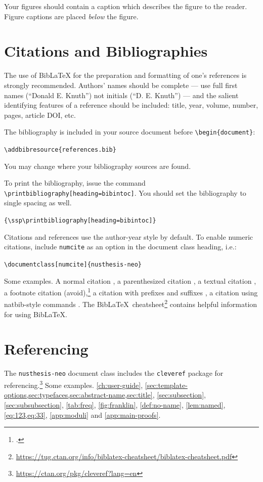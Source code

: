 Your figures should contain a caption which describes the figure to
the reader. Figure captions are placed \emph{below} the figure.


\section{Citations and Bibliographies}\label{sec:citations}

The use of BibLaTeX for the preparation and formatting of one's
references is strongly recommended. Authors' names should be complete
--- use full first names (``Donald E. Knuth'') not initials
(``D. E. Knuth'') --- and the salient identifying features of a
reference should be included: title, year, volume, number, pages,
article DOI, etc.

The bibliography is included in your source document before 
\texttt{\textbackslash begin\{document\}}:

\texttt{\textbackslash addbibresource\{references.bib\}}

You may change where your bibliography sources are found.

To print the bibliography, issue the command
\texttt{\textbackslash printbibliography[heading=bibintoc]}.
You should set the bibliography to single spacing as well.

\texttt{\{\textbackslash ssp\textbackslash printbibliography[heading=bibintoc]\}}

Citations and references use the author-year style by default. To
enable numeric citations, include \texttt{numcite} as an
option in the document class heading, i.e.:

\texttt{\textbackslash documentclass[numcite]\{nusthesis-neo\}}

Some examples. A normal citation \cite{00}, a parenthesized
citation \parencite{cite:31}, a textual citation \citet{cite:1},
a footnote citation (avoid),\footcite{cite:2} a citation with
prefixes and suffixes \parencite[see][pp. 123--124]{cite:3}, a
citation using natbib-style commands \citep{cite:4}. The
Bib\LaTeX\ cheatsheet\footnote{\url{https://tug.ctan.org/info/biblatex-cheatsheet/biblatex-cheatsheet.pdf}}
contains helpful information for using Bib\LaTeX.

\section{Referencing}
The \texttt{nusthesis-neo} document class includes the \texttt{cleveref}
package for referencing.\footnote{\url{https://ctan.org/pkg/cleveref?lang=en}}
Some examples. \cref{ch:user-guide}, \cref{sec:template-options,sec:typefaces,sec:abstract-name,sec:title},
\cref{sec:subsection}, \cref{sec:subsubsection}, \cref{tab:freq}, \cref{fig:franklin},
\cref{def:no-name}, \cref{lem:named}, \cref{eq:123,eq:33}, \cref{app:moduli} and \cref{app:main-proofs}.

